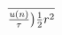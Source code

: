 \documentclass[preview]{standalone}
\begin{document}
\begin{align*}
\over {\frac {u(n)}{\tau} }\big) \frac {1} {2} r^2
\end{align*}
\end{document}
